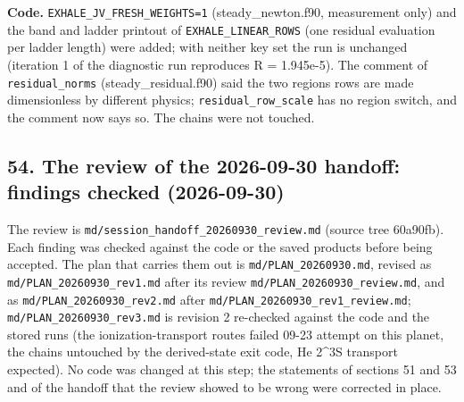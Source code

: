 \documentclass[english,a4paper]{my_memo}
\begin{document}
\textbf{Code.} \texttt{EXHALE\_JV\_FRESH\_WEIGHTS=1} (steady\_newton.f90, measurement only)
and the band and ladder printout of \texttt{EXHALE\_LINEAR\_ROWS} (one residual
evaluation per ladder length) were added; with neither key set the run is
unchanged (iteration 1 of the diagnostic run reproduces \textbar\textbar R\textbar\textbar{} = 1.945e-5).
The comment of \texttt{residual\_norms} (steady\_residual.f90) said the two regions\textquotesingle{}
rows are made dimensionless by different physics; \texttt{residual\_row\_scale} has
no region switch, and the comment now says so. The chains were not touched.

\subsection{54. The review of the 2026-09-30 handoff: findings checked (2026-09-30)}\label{54-the-review-of-the-2026-09-30-handoff-findings-checked-2026-09-30}

The review is \texttt{md/session\_handoff\_20260930\_review.md} (source tree
60a90fb). Each finding was checked against the code or the saved products
before being accepted. The plan that carries them out is
\texttt{md/PLAN\_20260930.md}, revised as \texttt{md/PLAN\_20260930\_rev1.md} after its review \texttt{md/PLAN\_20260930\_review.md}, and as \texttt{md/PLAN\_20260930\_rev2.md} after \texttt{md/PLAN\_20260930\_rev1\_review.md}; \texttt{md/PLAN\_20260930\_rev3.md} is revision 2 re-checked against the code and the stored runs (the ionization-transport route\textquotesingle s failed 09-23 attempt on this planet, the chains untouched by the derived-state exit code, He 2\^{}3S transport expected). No code was changed at this step; the statements
of sections 51 and 53 and of the handoff that the review showed to be
wrong were corrected in place.
\end{document}
